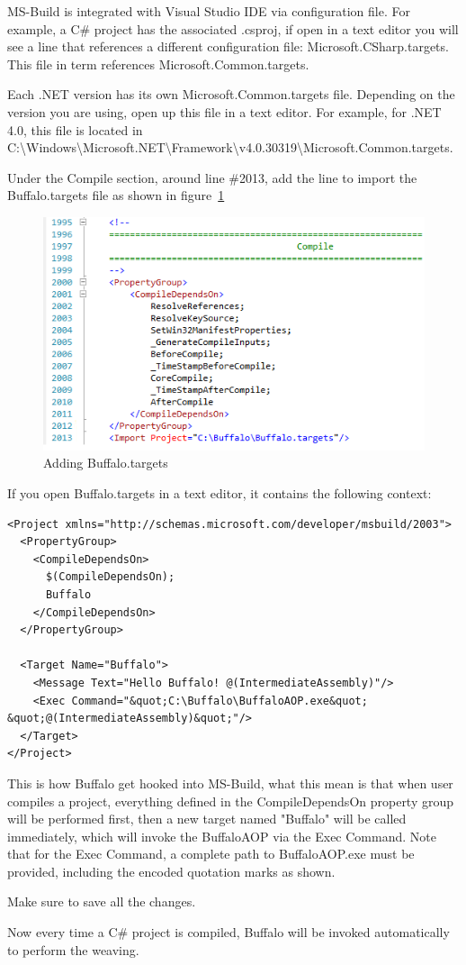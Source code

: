 MS-Build is integrated with Visual Studio IDE via configuration file. For example, a C\# project has the associated .csproj, if open in a text editor you will see a line that references a different configuration file: Microsoft.CSharp.targets. This file in term references Microsoft.Common.targets.

Each .NET version has its own Microsoft.Common.targets file. Depending on the version you are using, open up this file in a text editor. For example, for .NET 4.0, this file is located in C:\textbackslash Windows\textbackslash Microsoft.NET\textbackslash Framework\textbackslash v4.0.30319\textbackslash Microsoft.Common.targets.

Under the Compile section, around line \#2013, add the line to import the Buffalo.targets file as shown in figure~\ref{buffalo_targets}

\begin{figure}[H]
  \includegraphics[scale=1.0]{CommonTarget.PNG}
  \centering
  \caption{Adding Buffalo.targets\label{buffalo_targets}}
\end{figure}

If you open Buffalo.targets in a text editor, it contains the following context:

\begin{lstlisting}[caption={Buffalo.targets}, label=buffalotargets, frame=tb, basicstyle=\scriptsize]
﻿<Project xmlns="http://schemas.microsoft.com/developer/msbuild/2003">
  <PropertyGroup>
    <CompileDependsOn>
      $(CompileDependsOn);
      Buffalo
    </CompileDependsOn>
  </PropertyGroup>

  <Target Name="Buffalo">
    <Message Text="Hello Buffalo! @(IntermediateAssembly)"/>
    <Exec Command="&quot;C:\Buffalo\BuffaloAOP.exe&quot; &quot;@(IntermediateAssembly)&quot;"/>
  </Target>
</Project>
\end{lstlisting}

This is how Buffalo get hooked into MS-Build, what this mean is that when user compiles a project, everything defined in the CompileDependsOn property group will be performed first, then a new target named "Buffalo" will be called immediately, which will invoke the BuffaloAOP via the Exec Command. Note that for the Exec Command, a complete path to BuffaloAOP.exe must be provided, including the encoded quotation marks as shown.

Make sure to save all the changes. 

Now every time a C\# project is compiled, Buffalo will be invoked automatically to perform the weaving.
